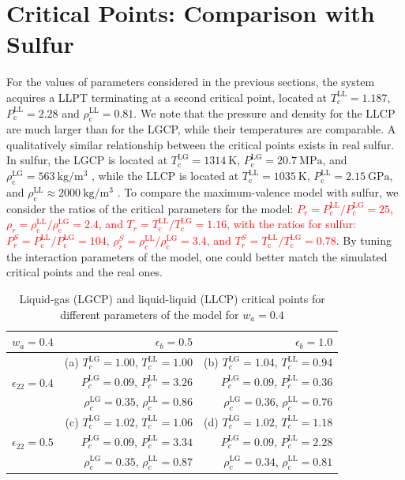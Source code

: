\documentclass[9pt,twocolumn,twoside,lineno]{pnas-new}
\newcommand{\red}[1]{\textcolor{red}{#1}}
\begin{document}
\section*{Critical Points: Comparison with Sulfur}
For the values of parameters considered in the previous sections, the system acquires a LLPT terminating at a second critical point, located at $T_\text{c}^\text{LL}=1.187$, $P_\text{c}^\text{LL}=2.28$ and $\rho_\text{c}^\text{LL}=0.81$. We note that the pressure and density for the LLCP are much larger than for the LGCP, while their temperatures are comparable. A qualitatively similar relationship between the critical points exists in real sulfur. In sulfur, the LGCP is located at $T_\text{c}^\text{LG}=\SI{1314}{\kelvin}$, $P_\text{c}^\text{LG}=\SI{20.7}{\mega\pascal}$, and $\rho_\text{c}^\text{LG}=\SI{563}{\kilogram/\meter^3}$ \cite{Lide2003}, while the LLCP is located at $T_\text{c}^\text{LL}=\SI{1035}{\kelvin}$, $P_\text{c}^\text{LL}=\SI{2.15}{\giga\pascal}$, and $\rho_\text{c}^\text{LL}\approx \SI{2000}{\kilogram/\meter^3}$ \cite{Henry2020}.
To compare the maximum-valence model with sulfur, we consider the ratios of the critical parameters for the model: \red{$P_r = P_\text{c}^\text{LL}/P_\text{c}^\text{LG}=25$, $\rho_r= \rho_\text{c}^\text{LL}/\rho_\text{c}^\text{LG}=2.4$, and $T_r = T_\text{c}^\text{LL}/T_\text{c}^\text{LG}=1.16$, with the ratios for sulfur:  $P_r^{S} = P_\text{c}^\text{LL}/P_\text{c}^\text{LG}=104$, $\rho_r^S=\rho_\text{c}^\text{LL}/\rho_\text{c}^\text{LG}=3.4$, and $T_r^{S} =T_\text{c}^\text{LL}/T_\text{c}^\text{LG}=0.78$}. By tuning the interaction parameters of the model, one could better match the simulated critical points and the real ones.

\begin{table}
\caption{Liquid-gas (LGCP) and liquid-liquid (LLCP) critical points for different parameters of the model for $w_a=0.4$}
\centering
\begin{tabular}{ |c||r|r| } 
 \hline
    $w_a=0.4$ & $\epsilon_b=0.5$ & $\epsilon_b=1.0$ \\ 
  \hline
  \hline
 \multirow{3}{4em}{$\epsilon_{22}=0.4$} &  (a) $T_c^\text{LG}=1.00$,  $T_c^\text{LL}=1.00$  &  (b) $T_c^\text{LG}=1.04$, $T_c^\text{LL}=0.94 $ \\
 &     $P_c^\text{LG}=0.09$, $P_c^\text{LL}=3.26$ & $P_c^\text{LG}=0.09$, $P_c^\text{LL}=0.36$ \\
 & $\rho_c^\text{LG}=0.35$, $\rho_c^\text{LL}=0.86$ &  $\rho_c^\text{LG}=0.36$, $\rho_c^\text{LL}=0.76$ \\ 
 \hline
 
  \multirow{3}{4em}{$\epsilon_{22}=0.5$} &  (c) $T_c^\text{LG}=1.02$, $T_c^\text{LL}=1.06$ &  (d) $T_c^\text{LG}=1.02$, $T_c^\text{LL}=1.18$ \\
 &  $P_c^\text{LG}=0.09$, $P_c^\text{LL}=3.34$ & $P_c^\text{LG}=0.09$, $P_c^\text{LL}=2.28$ \\
 & $\rho_c^\text{LG}=0.35$, $\rho_c^\text{LL}=0.87$ & $ \rho_c^\text{LG}=0.34$, $\rho_\text{c}^\text{LL}=0.81$ \\ 
 \hline

\end{tabular}
\label{Table1}
\end{table}
\end{document}
